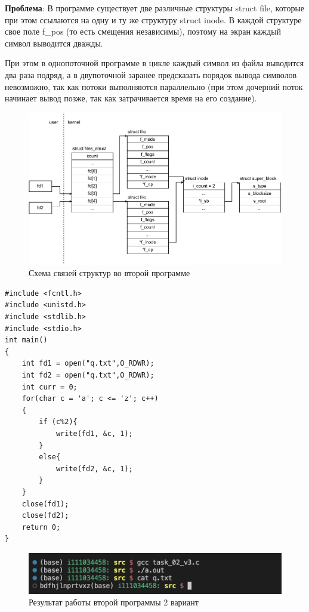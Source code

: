 \textbf{Проблема}: В программе существует две различные структуры struct file, которые при этом ссылаются на одну и ту же структуру struct inode. В каждой структуре свое поле f\_pos (то есть смещения независимы), поэтому на экран каждый символ выводится дважды.

При этом в однопоточной программе в цикле каждый символ из файла выводится два раза подряд, а в двупоточной заранее предсказать порядок вывода символов невозможно, так как потоки выполняются параллельно (при этом дочерний поток начинает вывод позже, так как затрачивается время на его создание).

\begin{figure}[H]
	\centering
	\includegraphics[scale=0.9]{inc/img/task02.pdf}
	\caption{Схема связей структур во второй программе}
	\label{fig:prog_01_thread}
\end{figure}

\begin{center}
\captionsetup{justification=raggedright,singlelinecheck=off}
\begin{lstlisting}[label=lst:add,caption=Вторая программа 2 вариант]
#include <fcntl.h>
#include <unistd.h>
#include <stdlib.h>
#include <stdio.h>
int main() 
{
  	int fd1 = open("q.txt",O_RDWR);
 	int fd2 = open("q.txt",O_RDWR);
  	int curr = 0;
  	for(char c = 'a'; c <= 'z'; c++)
  	{
  		if (c%2){
			write(fd1, &c, 1);
		}
  		else{
			write(fd2, &c, 1);
		}
  	}
  	close(fd1);
  	close(fd2);
	return 0;
}
\end{lstlisting}
\end{center}

\begin{figure}[H]
	\centering
	\includegraphics[scale=1]{inc/img/task_02_v3.png}
	\caption{Результат работы второй программы 2 вариант}
	\label{fig:prog_022}
\end{figure}

